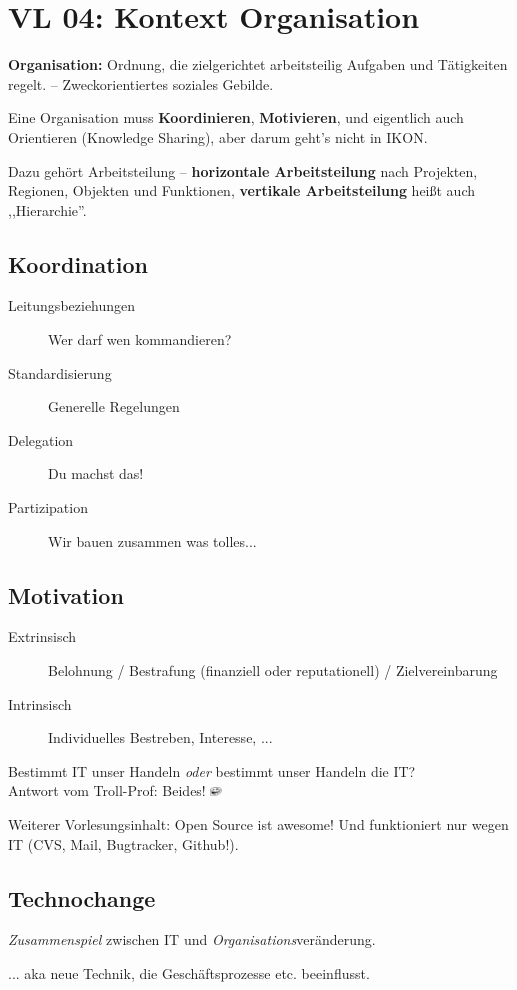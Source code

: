 \section{VL 04: Kontext Organisation}

\textbf{Organisation:} Ordnung, die zielgerichtet arbeitsteilig Aufgaben und
Tätigkeiten regelt. -- Zweckorientiertes soziales Gebilde.

Eine Organisation muss \textbf{Koordinieren}, \textbf{Motivieren}, und eigentlich auch
Orientieren (Knowledge Sharing), aber darum geht's nicht in IKON.

Dazu gehört Arbeitsteilung -- \textbf{horizontale Arbeitsteilung} nach Projekten, Regionen, Objekten und Funktionen,
\textbf{vertikale Arbeitsteilung} heißt auch ,,Hierarchie''.

\subsection{Koordination}

\begin{description}
    \item[Leitungsbeziehungen] Wer darf wen kommandieren?
    \item[Standardisierung] Generelle Regelungen
    \item[Delegation] Du machst das!
    \item[Partizipation] Wir bauen zusammen was tolles...
\end{description}

\subsection{Motivation}

\begin{description}
    \item[Extrinsisch] Belohnung / Bestrafung (finanziell oder reputationell) / Zielvereinbarung
    \item[Intrinsisch] Individuelles Bestreben, Interesse, ...
\end{description}

\begin{center}{\large Bestimmt IT unser Handeln \emph{oder} bestimmt unser Handeln die IT?}\\
{\footnotesize Antwort vom Troll-Prof: Beides! \includegraphics[width=0.3cm]{wichtige-anmerkung.png}}\end{center}

Weiterer Vorlesungsinhalt: Open Source ist awesome! Und funktioniert nur wegen IT (CVS, Mail, Bugtracker, Github!).

\subsection{Technochange}

\begin{center}{\large \emph{Zusammenspiel} zwischen IT und \emph{Organisations}veränderung.}

... aka neue Technik, die Geschäftsprozesse etc. beeinflusst.
\end{center}
